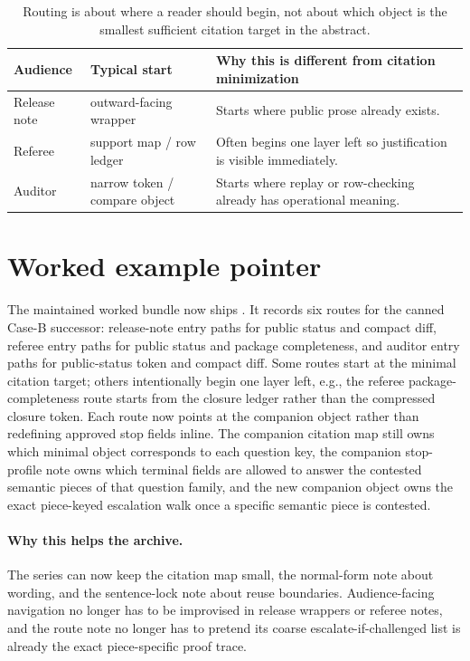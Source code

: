 \documentclass[11pt]{article}
\begin{document}
\begin{table}[t]
\centering
\small
\begin{tabularx}{\linewidth}{@{}l l X@{}}
\toprule
Audience & Typical start & Why this is different from citation minimization \\
\midrule
Release note & outward-facing wrapper & Starts where public prose already exists. \\
Referee & support map / row ledger & Often begins one layer left so justification is visible immediately. \\
Auditor & narrow token / compare object & Starts where replay or row-checking already has operational meaning. \\
\bottomrule
\end{tabularx}
\caption{Routing is about where a reader should begin, not about which object is the smallest sufficient citation target in the abstract.}
\label{tab:audiences}
\end{table}

\section{Worked example pointer}
The maintained worked bundle now ships .\cite{series:workedexample}
It records six routes for the canned Case-B successor: release-note entry paths for public status and compact diff, referee entry paths for public status and package completeness, and auditor entry paths for public-status token and compact diff.
Some routes start at the minimal citation target; others intentionally begin one layer left, e.g., the referee package-completeness route starts from the closure ledger rather than the compressed closure token.
Each route now points at the companion  object rather than redefining approved stop fields inline. The companion citation map still owns which minimal object corresponds to each question key, the companion stop-profile note owns which terminal fields are allowed to answer the contested semantic pieces of that question family, and the new companion  object owns the exact piece-keyed escalation walk once a specific semantic piece is contested.\cite{series:downstreamnormalforms,series:challengestops,series:challengebranches}

\paragraph{Why this helps the archive.}
The series can now keep the citation map small, the normal-form note about wording, and the sentence-lock note about reuse boundaries.
Audience-facing navigation no longer has to be improvised in release wrappers or referee notes, and the route note no longer has to pretend its coarse escalate-if-challenged list is already the exact piece-specific proof trace.
\end{document}
